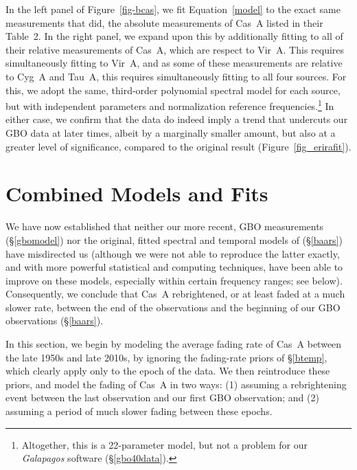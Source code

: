 \documentclass[fleqn,usenatbib]{mnras}
\begin{document}
In the left panel of Figure~\ref{fig-bcas}, we fit Equation~\ref{model} to the exact same measurements that \citet{b77} did, the absolute measurements of Cas~A listed in their Table~2.  In the right panel, we expand upon this by additionally fitting to all of their relative measurements of Cas~A, which are respect to Vir~A.  This requires simultaneously fitting to Vir~A, and as some of these measurements are relative to Cyg~A and Tau~A, this requires simultaneously fitting to all four sources.  For this, we adopt the same, third-order polynomial spectral model for each source, but with independent parameters and normalization reference frequencies.\footnote{Altogether, this is a 22-parameter model, but not a problem for our \textit{Galapagos} software (\S\ref{gbo40data}).}  In either case, we confirm that the \citet{b77} data do indeed imply a trend that undercuts our GBO data at later times, albeit by a marginally smaller amount, but also at a greater level of significance, compared to the original result (Figure~\ref{fig_erirafit}). 

\section{Combined Models and Fits}\label{combine}

We have now established that neither our more recent, GBO measurements (\S\ref{gbomodel}) nor the original, fitted spectral and temporal models of \citet{b77} (\S\ref{baars}) have misdirected us (although we were not able to reproduce the latter exactly, and with more powerful statistical and computing techniques, have been able to improve on these models, especially within certain frequency ranges; see below).  Consequently, we conclude that Cas~A rebrightened, or at least faded at a much slower rate, between the end of the \citet{b77} observations and the beginning of our GBO observations (\S\ref{baars}).

In this section, we begin by modeling the average fading rate of Cas~A between the late 1950s and late 2010s, by ignoring the fading-rate priors of \S\ref{btemp}, which clearly apply only to the epoch of the \citet{b77} data.  We then reintroduce these priors, and model the fading of Cas~A in two ways:  (1) assuming a rebrightening event between the last \citet{b77} observation and our first GBO observation; and (2) assuming a period of much slower fading between these epochs.
\end{document}
